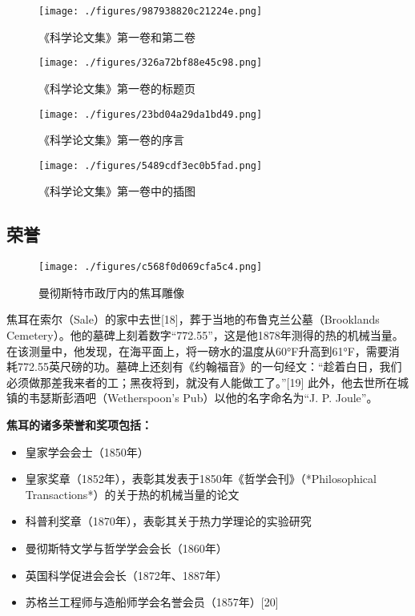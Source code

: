 \begin{figure}[ht]
\centering
\texttt{[image: ./figures/987938820c21224e.png]}
\caption{《科学论文集》第一卷和第二卷} \label{fig_JR_4}
\end{figure}
\begin{figure}[ht]
\centering
\texttt{[image: ./figures/326a72bf88e45c98.png]}
\caption{《科学论文集》第一卷的标题页} \label{fig_JR_5}
\end{figure}
\begin{figure}[ht]
\centering
\texttt{[image: ./figures/23bd04a29da1bd49.png]}
\caption{《科学论文集》第一卷的序言} \label{fig_JR_6}
\end{figure}
\begin{figure}[ht]
\centering
\texttt{[image: ./figures/5489cdf3ec0b5fad.png]}
\caption{《科学论文集》第一卷中的插图} \label{fig_JR_7}
\end{figure}
\subsection{荣誉}
\begin{figure}[ht]
\centering
\texttt{[image: ./figures/c568f0d069cfa5c4.png]}
\caption{曼彻斯特市政厅内的焦耳雕像} \label{fig_JR_8}
\end{figure}
焦耳在索尔（Sale）的家中去世[18]，葬于当地的布鲁克兰公墓（Brooklands Cemetery）。他的墓碑上刻着数字“772.55”，这是他1878年测得的热的机械当量。在该测量中，他发现，在海平面上，将一磅水的温度从60°F升高到61°F，需要消耗772.55英尺磅的功。墓碑上还刻有《约翰福音》的一句经文：“趁着白日，我们必须做那差我来者的工；黑夜将到，就没有人能做工了。”[19] 此外，他去世所在城镇的韦瑟斯彭酒吧（Wetherspoon's Pub）以他的名字命名为“J. P. Joule”。  

\textbf{焦耳的诸多荣誉和奖项包括：}  

\begin{itemize}
\item 皇家学会会士（1850年）  
\item 皇家奖章（1852年），表彰其发表于1850年《哲学会刊》（*Philosophical Transactions*）的关于热的机械当量的论文  
\item 科普利奖章（1870年），表彰其关于热力学理论的实验研究  
\item 曼彻斯特文学与哲学学会会长（1860年）  
\item 英国科学促进会会长（1872年、1887年）  
\item 苏格兰工程师与造船师学会名誉会员（1857年）[20]  
\end{itemize}

